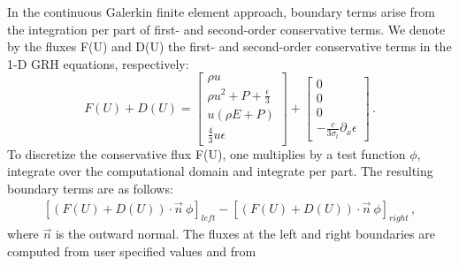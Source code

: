 In the continuous Galerkin finite element approach, boundary terms arise from the integration per part of first- and second-order conservative terms. We denote by the fluxes F(U) and D(U) the first- and second-order conservative terms in the 1-D GRH equations, respectively:
%
\begin{equation}
F(U) + D(U) = 
\begin{bmatrix}
\rho u \\
\rho u^2 + P + \frac{\epsilon}{3} \\
u \left( \rho E + P \right) \\
\frac{4}{3} u \epsilon
\end{bmatrix}
+  
\begin{bmatrix}
0 \\
0 \\
0 \\
- \frac{c}{3 \sigma_t} \partial_x \epsilon
\end{bmatrix}
\,.
\end{equation}
%
To discretize the conservative flux F(U), one multiplies by a test function $\phi$, integrate over the computational domain and integrate per part. The resulting boundary terms are as follows:
%
\begin{eqnarray}
\left[\left(F(U)+D(U)\right) \cdot \vec{n} \ \phi \right]_{left} - \left[ \left(F(U)+D(U)\right) \cdot \vec{n} \ \phi \right]_{right} \, ,
\end{eqnarray}
%
where $\vec{n}$ is the outward normal. The fluxes at the left and right boundaries are computed from user specified values and from 

